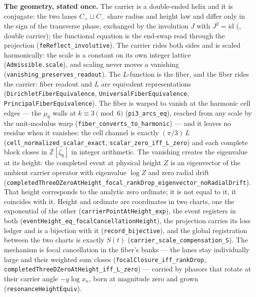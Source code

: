 \documentclass[11pt]{article}
\theoremstyle{definition}
\begin{document}
\medskip
\noindent\textbf{The geometry, stated once.} The carrier is a double-ended
helix and it is conjugate: the two lanes \(C_+\sqcup C_-\) share radius and
height law and differ only in the sign of the transverse phase, exchanged by
the involution \(J\) with \(J^2=\mathrm{id}\) (\cite{UniversalCarrier},
double carrier); the functional equation is the end-swap read through the
projection (\texttt{feReflect\_involutive}). The carrier rides both sides and
is scaled harmonically: the scale is a constant on its own integer lattice
(\texttt{Admissible.scale}), and scaling never moves a vanishing
(\texttt{vanishing\_preserves\_readout}). The \(L\)-function is the fiber, and
the fiber rides the carrier: fiber readout and \(L\) are equivalent
representations (\texttt{DirichletFiberEquivalence},
\texttt{UniversalFiberEquivalence}, \texttt{PrincipalFiberEquivalence}). The
fiber is warped to vanish at the harmonic cell edges --- the \(\mu_6\) walls at
\(k\equiv3\pmod 6\) (\texttt{pi3\_arcs\_eq}), reached from any scale by the
unit-modulus warp (\texttt{fiber\_converts\_to\_harmonic}) --- and it leaves no
residue when it vanishes: the cell channel is exactly \((\pi/3)\,L\)
(\texttt{cell\_normalized\_scalar\_exact}, \texttt{scalar\_zero\_iff\_L\_zero})
and each complete block closes in \(\mathbb Z[\zeta_6]\) in integer arithmetic.
The vanishing creates the eigenvalue at its height: the completed event at
physical height \(Z\) is an eigenvector of the ambient carrier operator with
eigenvalue \(\log Z\) and zero radial drift
(\texttt{completedThreeDZeroAtHeight\_focal\_rankDrop\_eigenvector\_noRadialDrift}).
That height corresponds to the analytic zero ordinate; it is not equal to it,
it coincides with it. Height and ordinate are coordinates in two charts, one
the exponential of the other (\texttt{carrierPointAtHeight\_exp}), the event
registers in both (\texttt{eventHeight\_eq\_focalCancellationHeight}), the
projection carries its loss ledger and is a bijection with it
(\texttt{record\_bijective}), and the global registration between the two
charts is exactly \(S(t)\) (\texttt{carrier\_scale\_compensation\_S}). The
mechanism is focal cancellation in the fiber's banks --- the lanes stay
individually large and their weighted sum closes
(\texttt{focalClosure\_iff\_rankDrop},
\texttt{completedThreeDZeroAtHeight\_iff\_L\_zero}) --- carried by phasors
that rotate at their carrier angle \(-y\log x_n\), born at magnitude zero and
grown (\texttt{resonanceHeightEquiv}).
\end{document}
